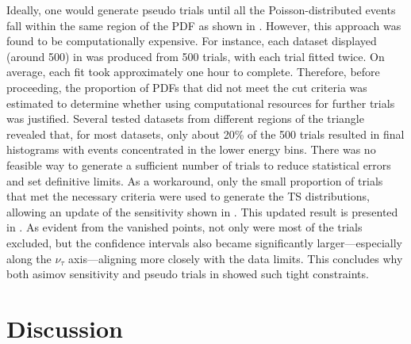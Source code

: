 Ideally, one would generate pseudo trials until all the Poisson-distributed events fall within the same region of the PDF as shown in . However, this approach was found to be computationally expensive. For instance, each dataset displayed (around 500) in  was produced from 500 trials, with each trial fitted twice. On average, each fit took approximately one hour to complete. Therefore, before proceeding, the proportion of PDFs that did not meet the cut criteria was estimated to determine whether using computational resources for further trials was justified. Several tested datasets from different regions of the triangle revealed that, for most datasets, only about 20\% of the 500 trials resulted in final histograms with events concentrated in the lower energy bins. There was no feasible way to generate a sufficient number of trials to reduce statistical errors and set definitive limits. As a workaround, only the small proportion of trials that met the necessary criteria were used to generate the TS distributions, allowing an update of the sensitivity shown in . This updated result is presented in . As evident from the vanished points, not only were most of the trials excluded, but the confidence intervals also became significantly larger—especially along the $\nu_{\tau}$ axis—aligning more closely with the data limits. This concludes why both asimov sensitivity and pseudo trials in  showed such tight constraints. 



\section{Discussion}
\label{sec:results_discussion}

